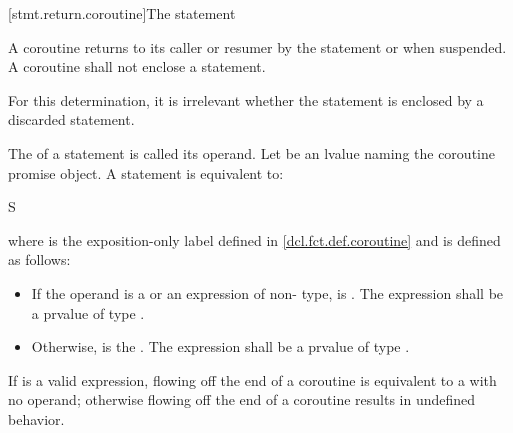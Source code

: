 [stmt.return.coroutine]{The  statement}%
%
%

\begin{bnf}
\br
      \terminal{;}
\end{bnf}

\pnum
A coroutine returns to its caller or resumer
by the  statement or when suspended.
A coroutine shall not enclose
a  statement.
\begin{note}
For this determination, it is irrelevant whether the  statement
is enclosed by a discarded statement.
\end{note}

\pnum
The  of a  statement is
called its operand.
Let  be an lvalue naming the coroutine
promise object.
A  statement is equivalent to:
\begin{ncsimplebnf}
\terminal{\{} S\terminal{;}  \terminal{;} \terminal{\}}
\end{ncsimplebnf}
where  is the exposition-only label
defined in \ref{dcl.fct.def.coroutine}
and  is defined as follows:
\begin{itemize}
\item
If the operand is a  or an expression of non- type,
 is \tcode{)}.
The expression  shall be a prvalue of type .

\item
Otherwise,
 is the  \tcode{\{}{ } \tcode{;} \tcode{;{ }\}}.
The expression 
shall be a prvalue of type .
\end{itemize}

\pnum
If  is a valid expression,
flowing off the end of a coroutine is equivalent to a  with no operand;
otherwise flowing off the end of a coroutine results in undefined behavior.

